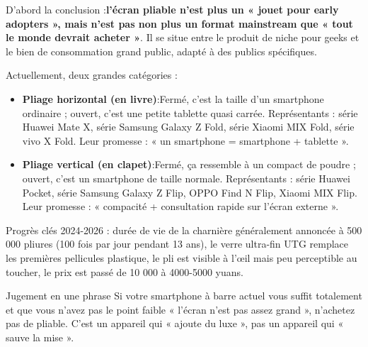 


D'abord la conclusion :\textbf{l'écran pliable n'est plus un « jouet pour early adopters », mais n'est pas non plus un format mainstream que « tout le monde devrait acheter »}. Il se situe entre le produit de niche pour geeks et le bien de consommation grand public, adapté à des publics spécifiques.

Actuellement, deux grandes catégories :

\begin{itemize}
  \item \textbf{Pliage horizontal (en livre)}:Fermé, c'est la taille d'un smartphone ordinaire ; ouvert, c'est une petite tablette quasi carrée. Représentants : série Huawei Mate X, série Samsung Galaxy Z Fold, série Xiaomi MIX Fold, série vivo X Fold. Leur promesse : « un smartphone = smartphone + tablette ».
  \item \textbf{Pliage vertical (en clapet)}:Fermé, ça ressemble à un compact de poudre ; ouvert, c'est un smartphone de taille normale. Représentants : série Huawei Pocket, série Samsung Galaxy Z Flip, OPPO Find N Flip, Xiaomi MIX Flip. Leur promesse : « compacité + consultation rapide sur l'écran externe ».
\end{itemize}

Progrès clés 2024-2026 : durée de vie de la charnière généralement annoncée à 500 000 pliures (100 fois par jour pendant 13 ans), le verre ultra-fin UTG remplace les premières pellicules plastique, le pli est visible à l'œil mais peu perceptible au toucher, le prix est passé de 10 000 à 4000-5000 yuans.

\begin{tcbinfo}{Jugement en une phrase}
Si votre smartphone à barre actuel vous suffit totalement et que vous n'avez pas le point faible « l'écran n'est pas assez grand », n'achetez pas de pliable. C'est un appareil qui « ajoute du luxe », pas un appareil qui « sauve la mise ».

\end{tcbinfo}

